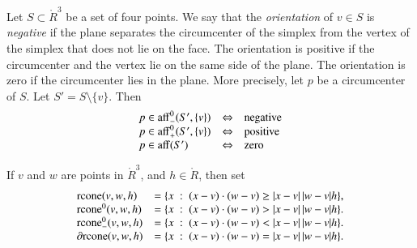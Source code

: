 \begin{tarskidata}
\begin{tarski}
\begin{definition}[orientation] 
Let $S\subset\ring{R}^3$ be a set of four points.
We say that the {\it orientation\/} of $v\in S$ is
{\it negative} if the plane separates the
circumcenter of the simplex from the vertex of the simplex that
does not lie on the face.  The orientation is positive if the
circumcenter and the vertex lie on the same side of the plane. The
orientation is zero if the circumcenter lies in the plane.
More precisely, let $p$ be a circumcenter of $S$.  Let $S'=S\setminus\{v\}$.  
Then
   $$
   \begin{array}{lll}
     p\in {\operatorname{aff}}_-^0(S',\{v\}) &\Leftrightarrow &\text{negative}\\
     p\in {\operatorname{aff}}_+^0(S',\{v\}) &\Leftrightarrow &\text{positive}\\
     p\in {\operatorname{aff}} (S') &\Leftrightarrow &\text{zero}\\
     \end{array}
   $$
\end{definition}
\end{tarski}



\begin{tarski}

\begin{definition}[rcone] 
If $v$ and $w$ are points in $\ring{R}^3$, and
  $h\in\ring{R}$, then set
  $$\begin{array}{lll}
    {\operatorname{rcone}}(v,w,h) &= \{x\ :\  (x-v)\cdot (w-v) \ge |x-v|\,|w-v| h\},\\
    {\operatorname{rcone}}^0(v,w,h) &= \{x\ :\  (x-v)\cdot (w-v) > |x-v|\,|w-v| h\}.\\
    {\operatorname{rcone}}_-^0(v,w,h) &= \{x\ :\  (x-v)\cdot (w-v) < |x-v|\,|w-v| h\}.\\
    \partial{\operatorname{rcone}}(v,w,h) &= \{x\ :\  (x-v)\cdot (w-v) = |x-v|\,|w-v| h\}.\\
    \end{array}
    $$
\end{definition}
\end{tarski}


\begin{tarski}


\end{tarski}
\end{tarskidata}
